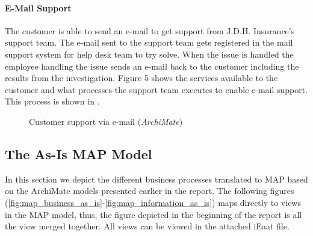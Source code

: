 \paragraph{E-Mail Support}
\label{sec:mail_support}
The customer is able to send an e-mail to get support from J.D.H. Insurance's support team. The e-mail sent to the support team gets registered in the mail support system for help desk team to try solve. When the issue is handled the employee handling the issue sends an e-mail back to the customer including the results from the investigation. Figure 5 shows the services available to the customer and what processes the support team executes to enable e-mail support. This process is shown in .
\begin{center}
	\begin{figure}[H]
		\centering
		\setlength\fboxsep{7pt}
		\setlength\fboxrule{0.5pt}
		\caption{Customer support via e-mail (\emph{ArchiMate})}
		\label{fig:archi_mail}
	\end{figure}
\end{center}
%
\subsection{The As-Is MAP Model}
\label{sec:as_is_map_model}
In this section we depict the different business processes translated to MAP based on the ArchiMate models presented earlier in the report. The following figures (\ref{fig:map_business_as_is}-\ref{fig:map_information_as_is}) maps directly to views in the MAP model, thus, the figure depicted in the beginning of the report is all the view merged together. All views can be viewed in the attached iEaat file.
%

